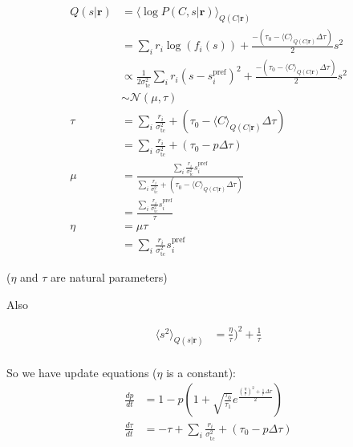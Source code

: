 \documentclass[12pt]{article}
\begin{document}
\begin{equation}
\begin{aligned}
Q(s|\mathbf{r}) &= \langle \log P(C, s|\mathbf{r}) \rangle_{Q(C|\mathbf{r})}\\
&= \sum_i r_i \log(f_i(s)) + \frac{- (\tau_0 - \langle C \rangle_{Q(C|\mathbf{r})} \Delta \tau)}{2} s^2\\
&\propto \frac{1}{2 \sigma^2_{\text{tc}}} \sum_i r_i (s - s_i^{\text{pref}})^2 + \frac{- (\tau_0 - \langle C \rangle_{Q(C|\mathbf{r})} \Delta \tau)}{2} s^2\\
&\sim \mathcal{N} (\mu, \tau)\\
\tau &= \sum_i \frac{r_i}{\sigma^2_{\text{tc}}}+ (\tau_0 - \langle C \rangle_{Q(C|\mathbf{r})} \Delta \tau)\\
&= \sum_i \frac{r_i}{\sigma^2_{\text{tc}}}+ (\tau_0 - p \Delta \tau)\\
\mu &= \frac{\sum_i \frac{r_i}{\sigma^2_{\text{tc}}}s_i^{\text{pref}}}{\sum_i \frac{r_i}{\sigma^2_{\text{tc}}}+ (\tau_0 - \langle C \rangle_{Q(C|\mathbf{r})} \Delta \tau)}\\
&= \frac{\sum_i \frac{r_i}{\sigma^2_{\text{tc}}}s_i^{\text{pref}}}{\tau}\\
\eta &= \mu \tau\\
&= \sum_i \frac{r_i}{\sigma^2_{\text{tc}}}s_i^{\text{pref}}
\end{aligned}
\end{equation}

($\eta$ and $\tau$ are natural parameters)

Also

\begin{equation}
\begin{aligned}
\langle s^2 \rangle_{Q(s|\mathbf{r})} &= \frac{\eta}{\tau})^2 + \frac{1}{\tau}\\
\end{aligned}
\end{equation}

So we have update equations ($\eta$ is a constant):
\begin{equation}
\begin{aligned}
\frac{dp}{dt} &= 1 - p(1 + \sqrt{\frac{\tau_0}{\tau_1}} e^{\frac{(\frac{\eta}{\tau})^2 + \frac{1}{\tau} \Delta \tau}{2}})\\
\frac{d \tau}{dt} &= -\tau + \sum_i \frac{r_i}{\sigma^2_{\text{tc}}}+ (\tau_0 - p \Delta \tau)\\
\end{aligned}
\end{equation}
\end{document}
